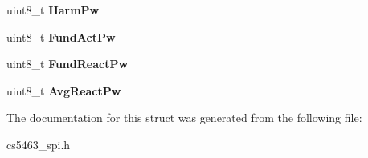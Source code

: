 \begin{DoxyCompactItemize}
\item 
\hypertarget{structcs5463ReadValues_a181e51df1fdc2660a5bcb7b5cd916679}{uint8\-\_\-t {\bfseries Harm\-Pw}}\label{structcs5463ReadValues_a181e51df1fdc2660a5bcb7b5cd916679}

\item 
\hypertarget{structcs5463ReadValues_a7ed144cc84c46c1207e277e3b62101ff}{uint8\-\_\-t {\bfseries Fund\-Act\-Pw}}\label{structcs5463ReadValues_a7ed144cc84c46c1207e277e3b62101ff}

\item 
\hypertarget{structcs5463ReadValues_af58b84e44ab2b7a376812dbec6e9df5d}{uint8\-\_\-t {\bfseries Fund\-React\-Pw}}\label{structcs5463ReadValues_af58b84e44ab2b7a376812dbec6e9df5d}

\item 
\hypertarget{structcs5463ReadValues_a36b78324bcd25cb05340538394ff7d3a}{uint8\-\_\-t {\bfseries Avg\-React\-Pw}}\label{structcs5463ReadValues_a36b78324bcd25cb05340538394ff7d3a}

\end{DoxyCompactItemize}


The documentation for this struct was generated from the following file\-:\begin{DoxyCompactItemize}
\item 
cs5463\-\_\-spi.\-h\end{DoxyCompactItemize}

